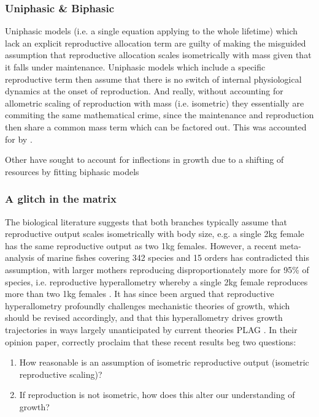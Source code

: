 \documentclass[a4paper]{article} %
\begin{document}
        \subsubsection{Uniphasic \& Biphasic}
        Uniphasic models (i.e. a single equation applying to the whole lifetime) which lack an explicit reproductive allocation term are guilty of making the misguided assumption that reproductive allocation scales isometrically with mass given that it falls under maintenance. Uniphasic models which include a specific reproductive term then assume that there is no switch of internal physiological dynamics at the onset of reproduction. And really, without accounting for allometric scaling of reproduction with mass (i.e. isometric) they essentially are commiting the same mathematical crime, since the maintenance and reproduction then share a common mass term which can be factored out. This was accounted for by \cite{Charnov2001}.

        Other have sought to account for inflections in growth due to a shifting of resources by fitting biphasic models 

        \subsubsection{A glitch in the matrix}

        The biological literature suggests that both branches typically assume that reproductive output scales isometrically with body size, e.g. a single 2kg female has the same reproductive output as two 1kg females. However, a recent meta-analysis of marine fishes covering 342 species and 15 orders has contradicted this assumption, with larger mothers reproducing disproportionately more for 95\% of species, i.e. reproductive hyperallometry whereby a single 2kg female reproduces more than two 1kg females \autocite{Barneche2018d}. It has since been argued that reproductive hyperallometry profoundly challenges mechanistic theories of growth, which should be revised accordingly, and that this hyperallometry drives growth trajectories in ways largely unanticipated by current theories PLAG \autocite{Marshall2019b}. In their opinion paper, \cite{Marshall2019b} correctly proclaim that these recent results beg two questions:
        \begin{enumerate}
            \item How reasonable is an assumption of isometric reproductive output (isometric reproductive scaling)?
            \item If reproduction is not isometric, how does this alter our understanding of growth?
        \end{enumerate}
\end{document}
